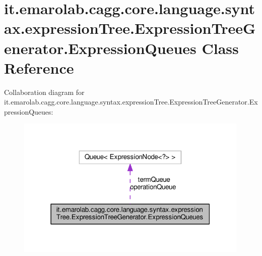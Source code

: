 \hypertarget{classit_1_1emarolab_1_1cagg_1_1core_1_1language_1_1syntax_1_1expressionTree_1_1ExpressionTreeGenerator_1_1ExpressionQueues}{\section{it.\-emarolab.\-cagg.\-core.\-language.\-syntax.\-expression\-Tree.\-Expression\-Tree\-Generator.\-Expression\-Queues Class Reference}
\label{classit_1_1emarolab_1_1cagg_1_1core_1_1language_1_1syntax_1_1expressionTree_1_1ExpressionTreeGenerator_1_1ExpressionQueues}
}


Collaboration diagram for it.\-emarolab.\-cagg.\-core.\-language.\-syntax.\-expression\-Tree.\-Expression\-Tree\-Generator.\-Expression\-Queues\-:\nopagebreak
\begin{figure}[H]
\begin{center}
\leavevmode
\includegraphics[width=316pt]{classit_1_1emarolab_1_1cagg_1_1core_1_1language_1_1syntax_1_1expressionTree_1_1ExpressionTreeGen9375d4d7fb2e6e27684590e57d14cd09}
\end{center}
\end{figure}
